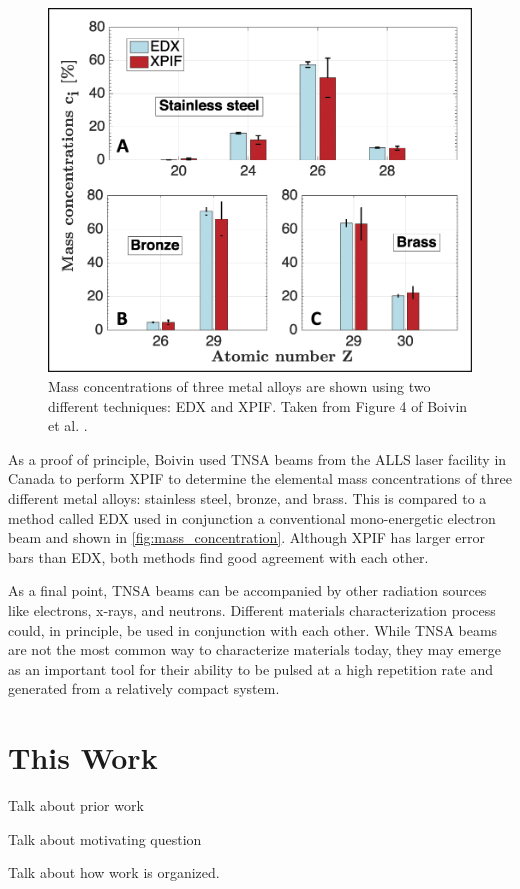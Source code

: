 \begin{figure}
	\centering
	\includegraphics[width=0.6\linewidth]{planning/images/mass_concentration.jpg}
	\caption{Mass concentrations of three metal alloys are shown using two different techniques: \gls{EDX} and \gls{XPIF}. Taken from Figure 4 of Boivin et al. \cite{Boivin_2022_NJoP}.}
	\label{fig:mass_concentration}
\end{figure}

As a proof of principle, Boivin \cite{Boivin_2022_NJoP} used TNSA beams from the \gls{ALLS} laser facility in Canada to perform \gls{XPIF} to determine the elemental mass concentrations of three different metal alloys: stainless steel, bronze, and  brass. This is compared to a method called \gls{EDX} used in conjunction a conventional mono-energetic electron beam and shown in \autoref{fig:mass_concentration}. Although XPIF has larger error bars than \gls{EDX}, both methods find good agreement with each other.

As a final point, \gls{TNSA} beams can be accompanied by other radiation sources like electrons, x-rays, and neutrons. Different materials characterization process could, in principle, be used in conjunction with each other. While \gls{TNSA} beams are not the most common way to characterize materials today, they may emerge as an important tool for their ability to be pulsed at a high repetition rate and generated from a relatively compact system.

\section{This Work}
Talk about prior work 


Talk about motivating question 


Talk about how work is organized. 


